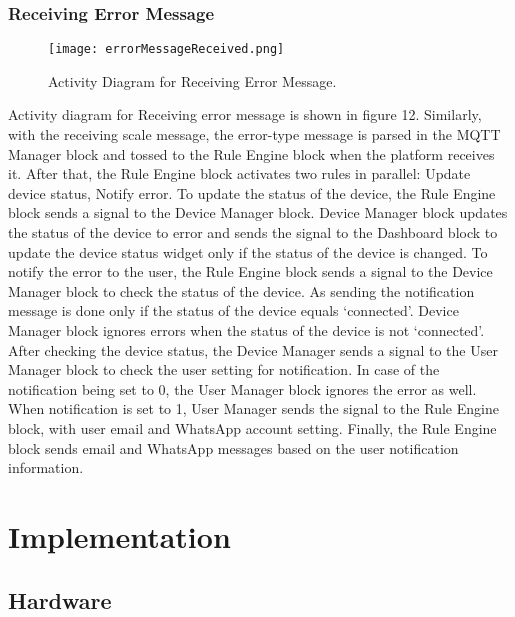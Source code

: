 \documentclass[conference]{IEEEtran}
\begin{document}
\subsubsection{Receiving Error Message}
\begin{figure}[htbp]
\centerline{\texttt{[image: errorMessageReceived.png]}}
\caption{Activity Diagram for Receiving Error Message.}
\label{fig}
\end{figure}
Activity diagram for Receiving error message is shown in figure 12. Similarly, with the receiving scale message, the error-type message is parsed in the MQTT Manager block and tossed to the Rule Engine block when the platform receives it. After that, the Rule Engine block activates two rules in parallel: Update device status, Notify error. To update the status of the device, the Rule Engine block sends a signal to the Device Manager block. Device Manager block updates the status of the device to error and sends the signal to the Dashboard block to update the device status widget only if the status of the device is changed. To notify the error to the user, the Rule Engine block sends a signal to the Device Manager block to check the status of the device. As sending the notification message is done only if the status of the device equals ‘connected’. Device Manager block ignores errors when the status of the device is not ‘connected’. After checking the device status, the Device Manager sends a signal to the User Manager block to check the user setting for notification. In case of the notification being set to 0, the User Manager block ignores the error as well. When notification is set to 1, User Manager sends the signal to the Rule Engine block, with user email and WhatsApp account setting. Finally, the Rule Engine block sends email and WhatsApp messages based on the user notification information.

\section{Implementation}
\subsection{Hardware}
\end{document}
